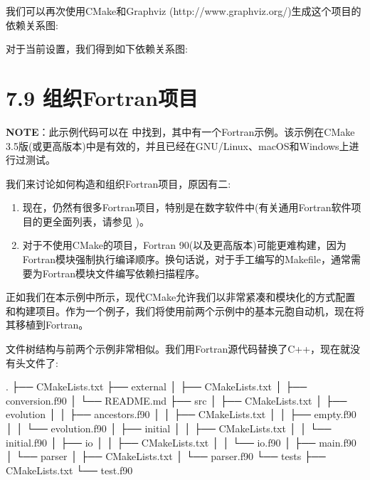 
我们可以再次使用CMake和Graphviz (http://www.graphviz.org/)生成这个项目的依赖关系图:


对于当前设置，我们得到如下依赖关系图:



\section{7.9 组织Fortran项目}

\begin{myInfoBox}
\textbf{NOTE}：此示例代码可以在  中找到，其中有一个Fortran示例。该示例在CMake 3.5版(或更高版本)中是有效的，并且已经在GNU/Linux、macOS和Windows上进行过测试。
\end{myInfoBox}

我们来讨论如何构造和组织Fortran项目，原因有二:

\begin{enumerate}
\item 现在，仍然有很多Fortran项目，特别是在数字软件中(有关通用Fortran软件项目的更全面列表，请参见 )。

\item 对于不使用CMake的项目，Fortran 90(以及更高版本)可能更难构建，因为Fortran模块强制执行编译顺序。换句话说，对于手工编写的Makefile，通常需要为Fortran模块文件编写依赖扫描程序。

\end{enumerate}

正如我们在本示例中所示，现代CMake允许我们以非常紧凑和模块化的方式配置和构建项目。作为一个例子，我们将使用前两个示例中的基本元胞自动机，现在将其移植到Fortran。


文件树结构与前两个示例非常相似。我们用Fortran源代码替换了C++，现在就没有头文件了:

\begin{codebox}[shell]
.
├── CMakeLists.txt
├── external
│    ├── CMakeLists.txt
│    ├── conversion.f90
│    └── README.md
├── src
│    ├── CMakeLists.txt
│    ├── evolution
│    │    ├── ancestors.f90
│    │    ├── CMakeLists.txt
│    │    ├── empty.f90
│    │    └── evolution.f90
│    ├── initial
│    │    ├── CMakeLists.txt
│    │    └── initial.f90
│    ├── io
│    │    ├── CMakeLists.txt
│    │    └── io.f90
│    ├── main.f90
│    └── parser
│        ├── CMakeLists.txt
│        └── parser.f90
└── tests
    ├── CMakeLists.txt
    └── test.f90
\end{codebox}

